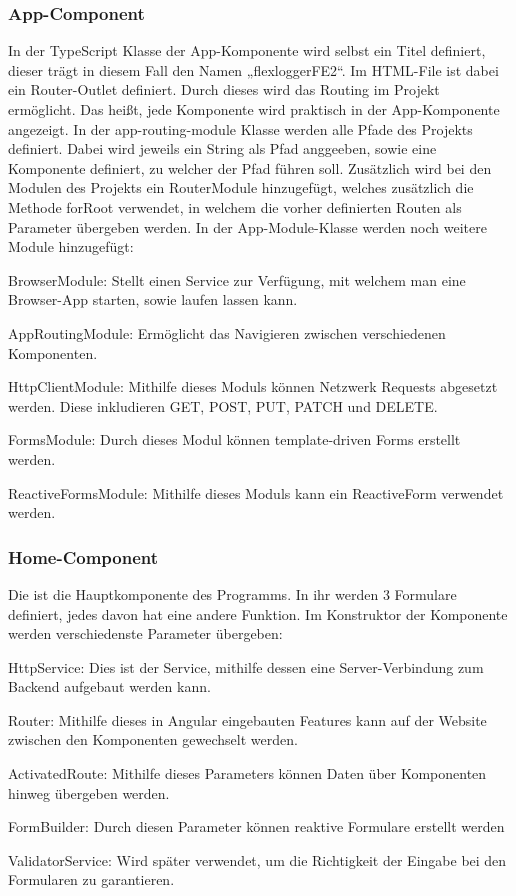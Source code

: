\subsubsection{App-Component}
In der TypeScript Klasse der App-Komponente wird selbst ein Titel definiert, dieser trägt in diesem Fall den Namen „flexloggerFE2“. Im HTML-File ist dabei ein Router-Outlet definiert. Durch dieses wird das Routing im Projekt ermöglicht. Das heißt, jede Komponente wird praktisch in der App-Komponente angezeigt. In der app-routing-module Klasse werden alle Pfade des Projekts definiert. Dabei wird jeweils ein String als Pfad anggeeben, sowie eine Komponente definiert, zu welcher der Pfad führen soll. Zusätzlich wird bei den Modulen des Projekts ein RouterModule hinzugefügt, welches zusätzlich die Methode forRoot verwendet, in welchem die vorher definierten Routen als Parameter übergeben werden. In der App-Module-Klasse werden noch weitere Module hinzugefügt: 

\begin{compactitem} 
    \item BrowserModule: Stellt einen Service zur Verfügung, mit welchem man eine Browser-App starten, sowie laufen lassen kann.    
    \item AppRoutingModule: Ermöglicht das Navigieren zwischen verschiedenen Komponenten.     
    \item HttpClientModule: Mithilfe dieses Moduls können Netzwerk Requests abgesetzt werden. Diese inkludieren GET, POST, PUT, PATCH und DELETE.    
    \item FormsModule: Durch dieses Modul können template-driven Forms erstellt werden.    
    \item ReactiveFormsModule: Mithilfe dieses Moduls kann ein ReactiveForm verwendet werden. 
\end{compactitem}

\subsubsection{Home-Component}
Die ist die Hauptkomponente des Programms. In ihr werden 3 Formulare definiert, jedes davon hat eine andere Funktion. Im Konstruktor der Komponente werden verschiedenste Parameter übergeben:

\begin{compactitem}
    \item HttpService: Dies ist der Service, mithilfe dessen eine Server-Verbindung zum Backend aufgebaut werden kann.    
    \item Router: Mithilfe dieses in Angular eingebauten Features kann auf der Website zwischen den Komponenten gewechselt werden.        
    \item ActivatedRoute: Mithilfe dieses Parameters können Daten über Komponenten hinweg übergeben werden.    
    \item FormBuilder: Durch diesen Parameter können reaktive Formulare erstellt werden
    \item ValidatorService: Wird später verwendet, um die Richtigkeit der Eingabe bei den Formularen zu garantieren.
\end{compactitem}

